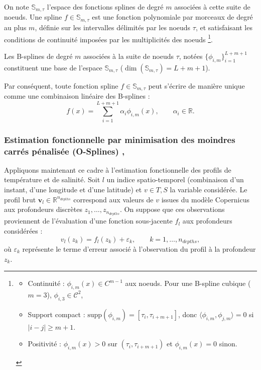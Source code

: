 \documentclass[11pt,a4paper,oneside]{report}
\begin{document}
	On note $\mathbb{S}_{m,\tau}$ l'espace des fonctions splines de degré $m$ associées à cette suite de noeuds. Une spline $f\in\mathbb{S}_{m,\tau}$ est une fonction polynomiale par morceaux de degré au plus $m$, définie sur les intervalles délimités par les noeuds $\tau$, et satisfaisant les conditions de continuité imposées par les multiplicités des noeuds \footnote{\begin{itemize}
			\item Continuité : $\phi_{i, m}(x) \in C^{m-1}$ aux noeuds. Pour une B-spline cubique ($m=3$), $\phi_{i, 3} \in \mathcal{C}^{2}$,
			\item Support compact : $\text{supp}(\phi_{i,m}) = [\tau_i, \tau_{i+m+1}]$, 
			donc $\langle \phi_{i,m}, \phi_{j,m} \rangle = 0$ si $|i-j| \geq m+1$.
			\item Positivité : $\phi_{i,m}(x) > 0$ sur $(\tau_i, \tau_{i+m+1})$ 
			et $\phi_{i,m}(x) = 0$ sinon.
	\end{itemize}}.
	
	Les B-splines de degré $m$ associées à la suite de noeuds $\tau$, notées $\{\phi_{i,m}\}_{i=1}^{L+m+1}$	constituent une base de l'espace $\mathbb{S}_{m,\tau}$ ($\dim(\mathbb{S}_{m,\tau})=L+m+1$).
	
	Par conséquent, toute fonction spline $f\in\mathbb{S}_{m,\tau}$ peut s'écrire de manière unique comme une combinaison linéaire des B-splines :
	\begin{equation}
		\boxed{
			f(x)=\sum_{i=1}^{L+m+1}\alpha_i\phi_{i,m}(x),
			\qquad \alpha_i\in\mathbb{R}.
		}
	\end{equation}
	
	\subsubsection{Estimation fonctionnelle par minimisation des moindres carrés pénalisée (O-Splines) \cite{wand2008}, \cite{eilers1996}}
	\label{par:moindres_carres}
	
	Appliquons maintenant ce cadre à l'estimation fonctionnelle des profils de température et de salinité. Soit $l$ un indice spatio-temporel (combinaison d'un instant, d'une longitude et d'une latitude) et $v \in {T,S}$ la variable considérée. Le profil brut $\mathbf{v}_l \in \mathbb{R}^{n_{depths}}$ correspond aux valeurs de $v$ issues du modèle Copernicus aux profondeurs discrètes $z_1,\ldots,z_{n_{depths}}$. On suppose que ces observations proviennent de l'évaluation d'une fonction sous-jacente $f_l$ aux profondeurs considérées :
	\begin{equation}
		v_l(z_k)=f_l(z_k)+\varepsilon_k,
		\qquad k=1,\ldots,n_{depths},
	\end{equation}
	où $\varepsilon_k$ représente le terme d'erreur associé à l'observation du profil à la profondeur $z_k$.
	
\end{document}
